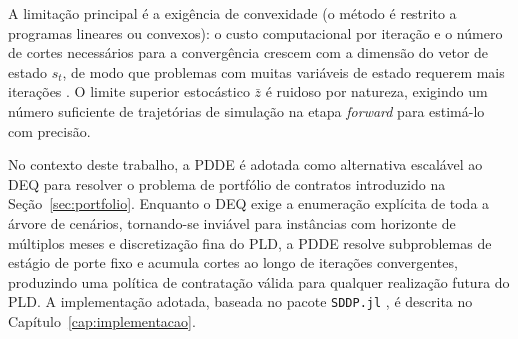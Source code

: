 A limitação principal é a exigência de convexidade (o método é restrito a programas lineares ou convexos): o custo computacional por iteração e o número de cortes necessários para a convergência crescem com a dimensão do vetor de estado $s_t$, de modo que problemas com muitas variáveis de estado requerem mais iterações \cite{shapiro2009}. O limite superior estocástico $\bar{z}$ é ruidoso por natureza, exigindo um número suficiente de trajetórias de simulação na etapa \textit{forward} para estimá-lo com precisão.

No contexto deste trabalho, a PDDE é adotada como alternativa escalável ao DEQ para resolver o problema de portfólio de contratos introduzido na Seção~\ref{sec:portfolio}. Enquanto o DEQ exige a enumeração explícita de toda a árvore de cenários, tornando-se inviável para instâncias com horizonte de múltiplos meses e discretização fina do PLD, a PDDE resolve subproblemas de estágio de porte fixo e acumula cortes ao longo de iterações convergentes, produzindo uma política de contratação válida para qualquer realização futura do PLD. A implementação adotada, baseada no pacote \texttt{SDDP.jl} \cite{dowson2021}, é descrita no Capítulo~\ref{cap:implementacao}.
